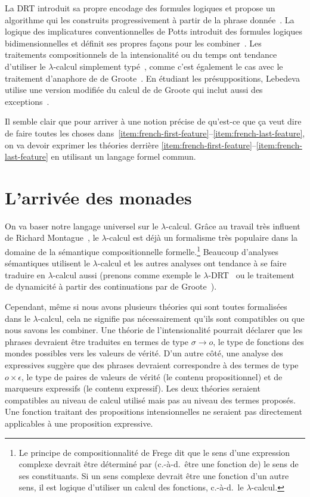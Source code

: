 La DRT introduit sa propre encodage des formules logiques et propose un
algorithme qui les construits progressivement à partir de la phrase
donnée~\cite{kamp1993discourse}. La logique des implicatures conventionnelles de
Potts introduit des formules logiques bidimensionnelles et définit ses propres
façons pour les combiner~\cite{potts2005logic}. Les traitements compositionnels
de la intensionalité ou du temps ont tendance d'utiliser le $\lambda$-calcul
simplement typé~\cite{ben2007semantics,de2013note}, comme c'est également le cas
avec le traitement d'anaphore de de Groote~\cite{de2006towards}. En étudiant les
présuppositions, Lebedeva utilise une version modifiée du calcul de de Groote
qui inclut aussi des exceptions~\cite{lebedeva2012expression}.

Il semble clair que pour arriver à une notion précise de qu'est-ce que ça veut
dire de faire toutes les choses
dans~\ref{item:french-first-feature}--\ref{item:french-last-feature}, on va devoir
exprimer les théories derrière
\ref{item:french-first-feature}--\ref{item:french-last-feature} en utilisant un
langage formel commun.


\section*{L'arrivée des monades}

On va baser notre langage universel sur le $\lambda$-calcul. Grâce au travail
très influent de Richard Montague~\cite{montague1973proper}, le $\lambda$-calcul
est déjà un formalisme très populaire dans la domaine de la sémantique
compositionnelle formelle.\footnote{Le principe de compositionnalité de Frege
  dit que le sens d'une expression complexe devrait être déterminé par (c.-à-d.\
  être une fonction de) le sens de ses constituants. Si un sens complexe devrait
  être une fonction d'un autre sens, il est logique d'utiliser un calcul des
  fonctions, c.-à-d.\ le $\lambda$-calcul.} Beaucoup d'analyses sémantiques
utilisent le $\lambda$-calcul et les autres analyses ont tendance à se faire
traduire en $\lambda$-calcul aussi (prenons comme exemple le
$\lambda$-DRT~\cite{kuschert1995type} ou le traitement de dynamicité à partir
des continuations par de Groote~\cite{de2006towards}).

Cependant, même si nous avons plusieurs théories qui sont toutes formalisées
dans le $\lambda$-calcul, cela ne signifie pas nécessairement qu'ils sont
compatibles ou que nous savons les combiner. Une théorie de l'intensionalité
pourrait déclarer que les phrases devraient être traduites en termes de type
$\sigma \to o$, le type de fonctions des mondes possibles vers les valeurs de
vérité. D'un autre côté, une analyse des expressives suggère que des phrases
devraient correspondre à des termes de type $o \times \epsilon$, le type de
paires de valeurs de vérité (le contenu propositionnel) et de marqueurs
expressifs (le contenu expressif). Les deux théories seraient compatibles au
niveau de calcul utilisé mais pas au niveau des termes proposés. Une fonction
traitant des propositions intensionnelles ne seraient pas directement
applicables à une proposition expressive.

